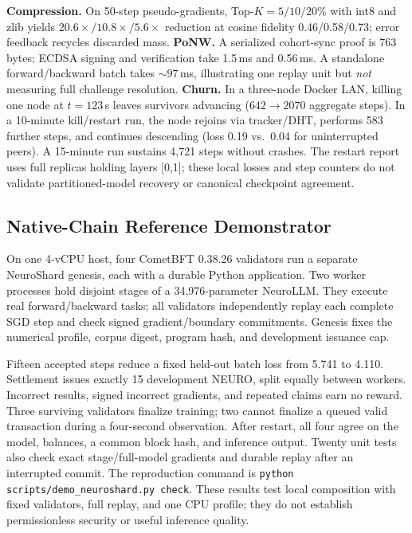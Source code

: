 \documentclass[conference]{IEEEtran}
\begin{document}
\textbf{Compression.} On 50-step pseudo-gradients, Top-$K=5/10/20\%$ with int8 and zlib yields $20.6\times/10.8\times/5.6\times$ reduction at cosine fidelity 0.46/0.58/0.73; error feedback recycles discarded mass.
\textbf{PoNW.} A serialized cohort-sync proof is 763 bytes; ECDSA signing and verification take 1.5\,ms and 0.56\,ms. A standalone forward/backward batch takes ${\sim}97$\,ms, illustrating one replay unit but \emph{not} measuring full challenge resolution.
\textbf{Churn.} In a three-node Docker LAN, killing one node at $t=123$\,s leaves survivors advancing ($642\to2070$ aggregate steps). In a 10-minute kill/restart run, the node rejoins via tracker/DHT, performs 583 further steps, and continues descending (loss 0.19 vs.\ 0.04 for uninterrupted peers). A 15-minute run sustains 4{,}721 steps without crashes. The restart report uses full replicas holding layers [0,1]; these local losses and step counters do not validate partitioned-model recovery or canonical checkpoint agreement.

\subsection{Native-Chain Reference Demonstrator}

On one 4-vCPU host, four CometBFT 0.38.26 validators run a separate NeuroShard genesis, each with a durable Python application. Two worker processes hold disjoint stages of a 34,976-parameter NeuroLLM. They execute real forward/backward tasks; all validators independently replay each complete SGD step and check signed gradient/boundary commitments. Genesis fixes the numerical profile, corpus digest, program hash, and development issuance cap.

Fifteen accepted steps reduce a fixed held-out batch loss from 5.741 to 4.110. Settlement issues exactly 15 development NEURO, split equally between workers. Incorrect results, signed incorrect gradients, and repeated claims earn no reward. Three surviving validators finalize training; two cannot finalize a queued valid transaction during a four-second observation. After restart, all four agree on the model, balances, a common block hash, and inference output. Twenty unit tests also check exact stage/full-model gradients and durable replay after an interrupted commit. The reproduction command is \texttt{python scripts/demo\_neuroshard.py check}. These results test local composition with fixed validators, full replay, and one CPU profile; they do not establish permissionless security or useful inference quality.
\end{document}
